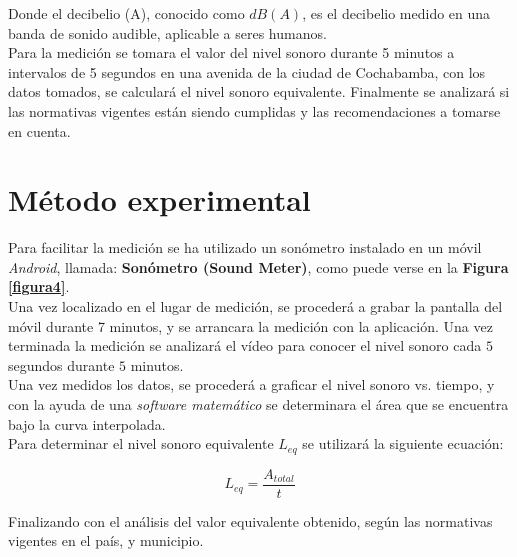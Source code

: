 \documentclass[letter,11pt]{article}
\newcommand{\source}[1]{\vspace{-11pt} \caption*{\small{\textbf{Nota:} {#1}}}}
\begin{document}
Donde el decibelio (A), conocido como $dB(A)$, es el decibelio medido en una
banda de sonido audible, aplicable a seres humanos.
\\

Para la medición se tomara el valor del nivel sonoro durante 5 minutos a
intervalos de 5 segundos en una avenida de la ciudad de Cochabamba, con los
datos tomados, se calculará el nivel sonoro equivalente. Finalmente se
analizará si las normativas vigentes están siendo cumplidas y las
recomendaciones a tomarse en cuenta.

\section{Método experimental}


Para facilitar la medición se ha utilizado un sonómetro instalado en un móvil
\emph{Android}, llamada: \textbf{Sonómetro (Sound Meter)}, como puede verse en
la \textbf{Figura \ref{figura4}}.
\\

Una vez localizado en el lugar de medición, se procederá a grabar la pantalla
del móvil durante 7 minutos, y se arrancara la medición con la aplicación. Una
vez terminada la medición se analizará el vídeo para conocer el nivel sonoro
cada $5$ segundos durante $5$ minutos.
\\

Una vez medidos los datos, se procederá a graficar el nivel sonoro vs. tiempo, y
con la ayuda de una \emph{software matemático} se determinara el área que se
encuentra bajo la curva interpolada.
\\

Para determinar el nivel sonoro equivalente $L_{eq}$ se utilizará la siguiente
ecuación:

\begin{equation*}
    L_{eq} = \frac{A_{total}}{t}
\end{equation*}
\vspace{0.10cm}

Finalizando con el análisis del valor equivalente obtenido, según las normativas
vigentes en el país, y municipio.
\\
\end{document}
